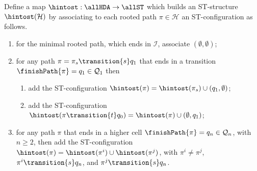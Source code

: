     \begin{definition}
        \label{def:HDA-to-ST-paths}
        Define a map $\hintost:\allHDA\rightarrow\allST$ which builds an ST-structure $\hintost(\mathcal{H})$ by associating to each rooted path $\pi\in \mathcal{H}$ an ST-configuration as follows.
        \begin{enumerate}
            \item\label{hintost_1} for the minimal rooted path, which ends in $\mathcal{I}$, associate $(\emptyset,\emptyset)$;

            \item\label{hintost_2} for any path $\pi=\pi_{s}\transition{s}q_{1}$ that ends in a transition $\finishPath{\pi}=q_{1}\in \mathcal{Q}_{1}$ then 
            \begin{enumerate}
                \item\label{hintost_21} add the ST-configuration $\hintost(\pi)=\hintost(\pi_{s})\cup(q_{1},\emptyset)$;
                \item\label{hintost_22} add the ST-configuration $\hintost(\pi\transition{t}q_{0})=\hintost(\pi)\cup(\emptyset,q_{1})$;
            \end{enumerate}

            \item\label{hintost_3} for any path $\pi$ that ends in a higher cell $\finishPath{\pi}=q_{n}\in \mathcal{Q}_{n}$, with $n\geq 2$, then add the ST-configuration $\hintost(\pi)=\hintost(\pi^{i}) \cup \hintost(\pi^{j})$, with $\pi^{i} \neq \pi^{j}$, $\pi^{i}\transition{s}q_{n}$, and $\pi^{j}\transition{s}q_{n}$.
        \end{enumerate}
 
 
 

 

\end{definition}

